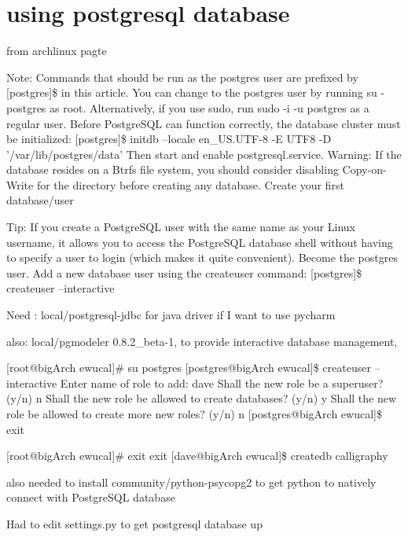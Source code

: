 \chapter{using postgresql database}


from archlinux pagte

Note: Commands that should be run as the postgres user are prefixed by [postgres]\$ in this article. You can change to the postgres user by running su - postgres as root. Alternatively, if you use sudo, run sudo -i -u postgres as a regular user.
Before PostgreSQL can function correctly, the database cluster must be initialized:
[postgres]\$ initdb --locale en_US.UTF-8 -E UTF8 -D '/var/lib/postgres/data'
Then start and enable postgresql.service.
Warning: If the database resides on a Btrfs file system, you should consider disabling Copy-on-Write for the directory before creating any database.
Create your first database/user

Tip: If you create a PostgreSQL user with the same name as your Linux username, it allows you to access the PostgreSQL database shell without having to specify a user to login (which makes it quite convenient).
Become the postgres user. Add a new database user using the createuser command:
[postgres]\$ createuser --interactive



Need : local/postgresql-jdbc  for java driver if I want to use pycharm

also:  local/pgmodeler 0.8.2_beta-1, to provide interactive database management,



[root@bigArch ewucal]# su postgres
[postgres@bigArch ewucal]\$ createuser --interactive
Enter name of role to add: dave
Shall the new role be a superuser? (y/n) n
Shall the new role be allowed to create databases? (y/n) y
Shall the new role be allowed to create more new roles? (y/n) n
[postgres@bigArch ewucal]\$ exit

[root@bigArch ewucal]# exit
exit
[dave@bigArch ewucal]\$ createdb calligraphy

also needed to install community/python-psycopg2 to get python to natively connect with PostgreSQL database


Had to edit settings.py to get postgresql database up

